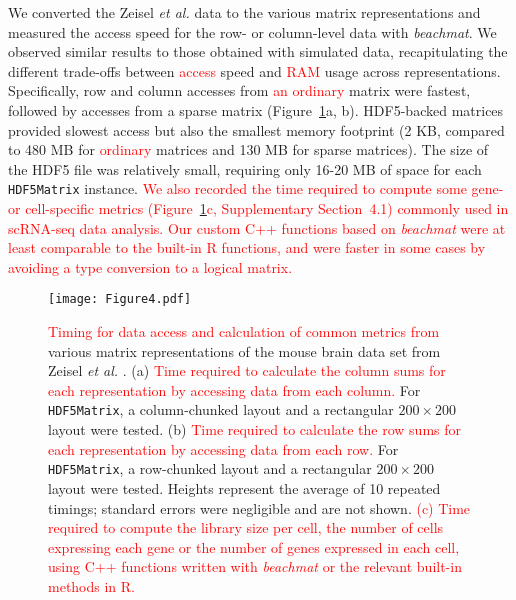 \documentclass[10pt,letterpaper]{article}
\newcommand{\suppsecrealzeisel}{4.1}
\newcommand{\beachmat}{\textit{beachmat}}
\newcommand{\code}[1]{\texttt{#1}}
\newcommand{\revised}[1]{\textcolor{red}{#1}}
\begin{document}
We converted the Zeisel \textit{et al.} data to the various matrix representations and measured the access speed for the row- or column-level data with \beachmat{}.
We observed similar results to those obtained with simulated data, recapitulating the different trade-offs between \revised{access} speed and \revised{RAM} usage across representations.
Specifically, row and column accesses from \revised{an ordinary} matrix were fastest, followed by accesses from a sparse matrix (Figure~\ref{fig:zeisel}a, b).
HDF5-backed matrices provided slowest access but also the smallest memory footprint (2 KB, compared to 480 MB for \revised{ordinary} matrices and 130 MB for sparse matrices).
The size of the HDF5 file was relatively small, requiring only 16-20 MB of space for each \code{HDF5Matrix} instance.
\revised{We also recorded the time required to compute some gene- or cell-specific metrics (Figure~\ref{fig:zeisel}c, Supplementary Section~\suppsecrealzeisel{}) commonly used in scRNA-seq data analysis.
Our custom C++ functions based on \beachmat{} were at least comparable to the built-in R functions, and were faster in some cases by avoiding a type conversion to a logical matrix.}

\begin{figure}[btp]
    \begin{center}
        \texttt{[image: Figure4.pdf]}
    \end{center}
    \caption{\revised{Timing for data access and calculation of common metrics from} various matrix representations of the mouse brain data set from Zeisel \textit{et al.} \cite{zeisel2015brain}.
(a) \revised{Time required to calculate the column sums for each representation by accessing data from each column.}
For \code{HDF5Matrix}, a column-chunked layout and a rectangular $200 \times 200$ layout were tested.
(b) \revised{Time required to calculate the row sums for each representation by accessing data from each row.}
For \code{HDF5Matrix}, a row-chunked layout and a rectangular $200 \times 200$ layout were tested.
Heights represent the average of 10 repeated timings; standard errors were negligible and are not shown.
\revised{(c) Time required to compute the library size per cell, the number of cells expressing each gene or the number of genes expressed in each cell, using C++ functions written with \beachmat{} or the relevant built-in methods in R.}}
    \label{fig:zeisel}
\end{figure}
\end{document}
